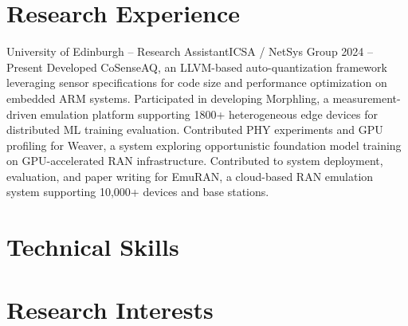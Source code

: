 \section{Research Experience}
  \resumeSubHeadingListStart
    \resumeSubheading
      {University of Edinburgh -- Research Assistant}{ICSA / NetSys Group}
      {\hfill 2024 -- Present}{}
      \resumeItemListStart
          {Developed CoSenseAQ, an LLVM-based auto-quantization framework leveraging sensor specifications for code size and performance optimization on embedded ARM systems.}
          {Participated in developing Morphling, a measurement-driven emulation platform supporting 1800+ heterogeneous edge devices for distributed ML training evaluation.}
          {Contributed PHY experiments and GPU profiling for Weaver, a system exploring opportunistic foundation model training on GPU-accelerated RAN infrastructure.}
          {Contributed to system deployment, evaluation, and paper writing for EmuRAN, a cloud-based RAN emulation system supporting 10,000+ devices and base stations.}
      \resumeItemListEnd
  \resumeSubHeadingListEnd

\section{Technical Skills}
  \resumeSubHeadingListStart
  \resumeSubHeadingListEnd

\section{Research Interests}
  \resumeSubHeadingListStart
  \resumeSubHeadingListEnd